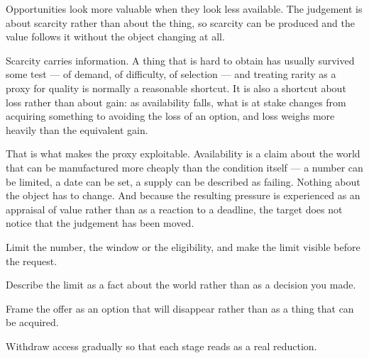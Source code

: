 


\begin{core}
Opportunities look more valuable when they look less available. The judgement is about scarcity rather than about the thing, so scarcity can be produced and the value follows it without the object changing at all.
\end{core}

\begin{mechanism}
Scarcity carries information. A thing that is hard to obtain has usually survived some test --- of demand, of difficulty, of selection --- and treating rarity as a proxy for quality is normally a reasonable shortcut. It is also a shortcut about loss rather than about gain: as availability falls, what is at stake changes from acquiring something to avoiding the loss of an option, and loss weighs more heavily than the equivalent gain.

That is what makes the proxy exploitable. Availability is a claim about the world that can be manufactured more cheaply than the condition itself --- a number can be limited, a date can be set, a supply can be described as failing. Nothing about the object has to change. And because the resulting pressure is experienced as an appraisal of value rather than as a reaction to a deadline, the target does not notice that the judgement has been moved.
\end{mechanism}

\begin{application}
  \item Limit the number, the window or the eligibility, and make the limit visible before the request.
  \item Describe the limit as a fact about the world rather than as a decision you made.
  \item Frame the offer as an option that will disappear rather than as a thing that can be acquired.
  \item Withdraw access gradually so that each stage reads as a real reduction.
\end{application}

